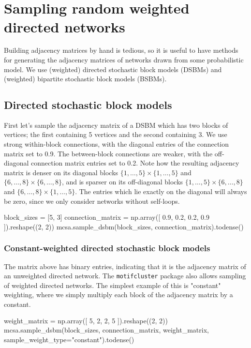 \documentclass{article}
\begin{document}
\section{Sampling random weighted directed networks}

Building adjacency matrices by hand is tedious,
so it is useful to have methods for generating
the adjacency matrices of networks drawn from some probabilistic model.
We use (weighted) directed stochastic block models (DSBMs) and
(weighted) bipartite stochastic block models (BSBMs).

\subsection{Directed stochastic block models}

First let's sample the adjacency matrix of a DSBM
which has two blocks of vertices;
the first containing 5 vertices and the second containing 3.
We use strong within-block connections,
with the diagonal entries of the connection matrix set to 0.9.
The between-block connections are weaker, with the off-diagonal
connection matrix entries set to 0.2.
Note how the resulting adjacency matrix is denser
on its diagonal blocks
$\{1, \dots, 5\} \times \{1, \dots, 5\}$
and
$\{6, \dots, 8\} \times \{6, \dots, 8\}$,
and is sparser on its off-diagonal blocks
$\{1, \dots, 5\} \times \{6, \dots, 8\}$
and
$\{6, \dots, 8\} \times \{1, \dots, 5\}$.
The entries which lie exactly on the diagonal will
always be zero,
since we only consider networks without self-loops.

\begin{pyconsole}
block_sizes = [5, 3]
connection_matrix = np.array([
  0.9, 0.2,
  0.2, 0.9
]).reshape((2, 2))
mcsa.sample_dsbm(block_sizes, connection_matrix).todense()
\end{pyconsole}

\subsubsection{Constant-weighted directed stochastic block models}

The matrix above has binary entries,
indicating that it is the adjacency matrix of an unweighted
directed network.
The \texttt{motifcluster} package also allows sampling of weighted directed networks.
The simplest example of this is "constant" weighting,
where we simply multiply each block of the adjacency matrix by a constant.


\begin{pyconsole}
weight_matrix = np.array([
  5, 2,
  2, 5
]).reshape((2, 2))
mcsa.sample_dsbm(block_sizes, connection_matrix, weight_matrix,
  sample_weight_type="constant").todense()
\end{pyconsole}
\end{document}
